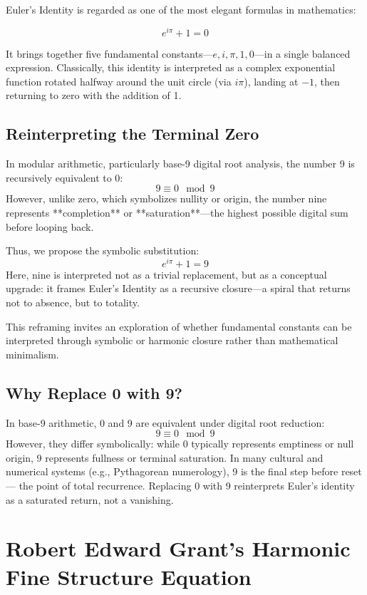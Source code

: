 \documentclass[12pt]{article}
\begin{document}
Euler’s Identity is regarded as one of the most elegant formulas in mathematics:

\[
e^{i\pi} + 1 = 0
\]

It brings together five fundamental constants—\( e, i, \pi, 1, 0 \)—in a single balanced expression. Classically, this identity is interpreted as a complex exponential function rotated halfway around the unit circle (via \( i\pi \)), landing at \( -1 \), then returning to zero with the addition of 1.

\subsection*{Reinterpreting the Terminal Zero}

In modular arithmetic, particularly base-9 digital root analysis, the number 9 is recursively equivalent to 0:
\[
9 \equiv 0 \mod 9
\]
However, unlike zero, which symbolizes nullity or origin, the number nine represents **completion** or **saturation**—the highest possible digital sum before looping back.

Thus, we propose the symbolic substitution:
\[
e^{i\pi} + 1 = 9
\]
Here, nine is interpreted not as a trivial replacement, but as a conceptual upgrade: it frames Euler’s Identity as a recursive closure—a spiral that returns not to absence, but to totality.

This reframing invites an exploration of whether fundamental constants can be interpreted through symbolic or harmonic closure rather than mathematical minimalism.

\subsection*{Why Replace 0 with 9?}

In base-9 arithmetic, 0 and 9 are equivalent under digital root reduction:
\[
9 \equiv 0 \mod 9
\]
However, they differ symbolically: while 0 typically represents emptiness or null origin, 9 represents fullness or terminal saturation. In many cultural and numerical systems (e.g., Pythagorean numerology), 9 is the final step before reset — the point of total recurrence. Replacing 0 with 9 reinterprets Euler’s identity as a saturated return, not a vanishing.

\newpage
\section{Robert Edward Grant’s Harmonic Fine Structure Equation}
\end{document}
